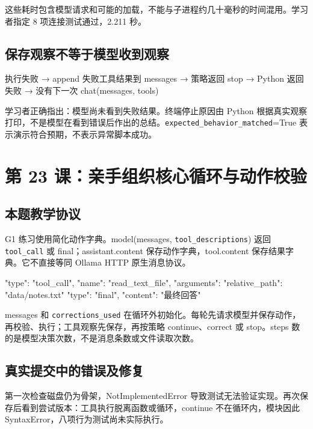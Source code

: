 这些耗时包含模型请求和可能的加载，不能与子进程约几十毫秒的时间混用。学习者指定 8 项连接测试通过，2.211 秒。

\subsection{保存观察不等于模型收到观察}

\begin{Code}
执行失败
  → append 失败工具结果到 messages
  → 策略返回 stop
  → Python 返回失败
  → 没有下一次 chat(messages, tools)
\end{Code}

学习者正确指出：模型尚未看到失败结果。终端停止原因由 Python 根据真实观察打印，不是模型在看到错误后作出的总结。\nolinkurl{expected_behavior_matched}=True 表示演示符合预期，不表示异常脚本成功。

\section{第 23 课：亲手组织核心循环与动作校验}

\subsection{本题教学协议}

G1 练习使用简化动作字典。model(messages, \nolinkurl{tool_descriptions}) 返回 \nolinkurl{tool_call} 或 final；assistant.content 保存动作字典，tool.content 保存结果字典。它不直接等同 Ollama HTTP 原生消息协议。

\begin{Code}
{"type": "tool_call", "name": "read_text_file",
 "arguments": {"relative_path": "data/notes.txt"}}
{"type": "final", "content": "最终回答"}
\end{Code}

messages 和 \nolinkurl{corrections_used} 在循环外初始化。每轮先请求模型并保存动作，再校验、执行；工具观察先保存，再按策略 continue、correct 或 stop。steps 数的是模型决策次数，不是消息条数或文件读取次数。

\subsection{真实提交中的错误及修复}

第一次检查磁盘仍为骨架，NotImplementedError 导致测试无法验证实现。再次保存后看到尝试版本：工具执行脱离函数或循环，continue 不在循环内，模块因此 SyntaxError，八项行为测试尚未实际执行。

